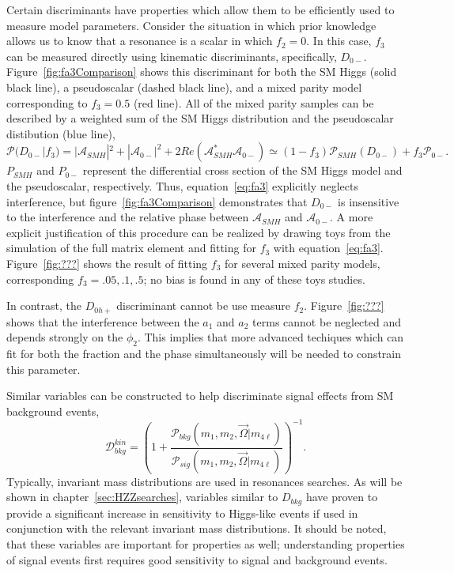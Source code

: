 Certain discriminants have properties which allow them to be efficiently
used to measure model parameters.  Consider the situation in which prior
knowledge allows us to know that a resonance is a scalar in which $f_2=0$.
In this case, $f_3$ can be measured directly using kinematic discriminants,
specifically, $D_{0-}$.  Figure~\ref{fig:fa3Comparison} shows this discriminant for
both the SM Higgs (solid black line), a pseudoscalar (dashed black line), and a mixed parity 
model corresponding to $f_3=0.5$ (red line).  All of the mixed
parity samples can be described by a weighted sum of the SM Higgs
distribution and the 
pseudoscalar distibution (blue line), 
\begin{equation}
\mathscr{P}(D_{0-}|f_3) = |\mathscr{A}_{SMH}|^2 + |\mathscr{A}_{0-}|^2 + 2Re(\mathscr{A}_{SMH}^*\mathscr{A}_{0-}) \simeq (1-f_3)\mathscr{P}_{SMH}(D_{0-})+f_3\mathscr{P}_{0-}.
\label{eq:fa3}
\end{equation}
$P_{SMH}$ and $P_{0-}$ represent the differential cross section of the 
SM Higgs model and the pseudoscalar, respectively.
Thus, equation~\ref{eq:fa3} explicitly neglects interference, but
figure~\ref{fig:fa3Comparison} demonstrates that $D_{0-}$ is insensitive to
the interference and the relative phase between $\mathscr{A}_{SMH}$ and
$\mathscr{A}_{0-}$.  A more explicit justification of this procedure can be
realized by drawing toys from the simulation of the full matrix element and
fitting for $f_3$ with equation~\ref{eq:fa3}.  Figure~\ref{fig:???} shows
the result of fitting $f_3$ for several mixed parity models, corresponding 
$f_3=.05,.1,.5$; no bias is found in any of these toys studies.

In contrast, the $D_{0h+}$ discriminant cannot be use measure $f_2$.  
Figure~\ref{fig:???} shows that the interference between the $a_1$
and $a_2$ terms cannot be neglected and depends strongly on the $\phi_2$.
This implies that more advanced techiques which can fit for both the
fraction and the phase simultaneously will be needed to constrain this parameter.

Similar variables can be constructed to help discriminate signal effects 
from SM background events,
\begin{equation}
\mathscr{D}^{kin}_{bkg} = \left(1+\frac{\mathscr{P}_{bkg}(m_1,m_2,\vec{\Omega}|m_{4\ell})}{\mathscr{P}_{sig}(m_1,m_2,\vec{\Omega}|m_{4\ell})}\right)^{-1}.
\label{eq:Dbkg}
\end{equation}
Typically, invariant mass distributions are used in resonances searches. 
As will be shown in chapter~\ref{sec:HZZsearches}, variables similar to 
$D_{bkg}$ have proven to provide a significant increase in sensitivity to 
Higgs-like events if used in conjunction with the relevant invariant
mass distributions.  It should be noted, that these variables are important
for properties as well; understanding properties of signal events first
requires good sensitivity to signal and background events.  


